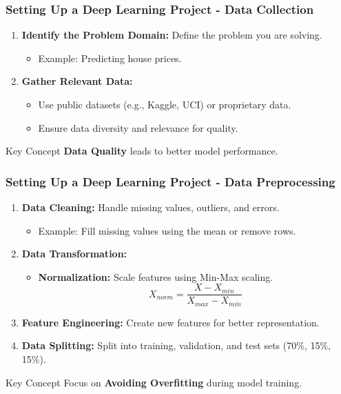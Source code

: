 \documentclass[aspectratio=169]{beamer}
\begin{document}
\begin{frame}[fragile]
    \frametitle{Setting Up a Deep Learning Project - Data Collection}
    \begin{enumerate}
        \item \textbf{Identify the Problem Domain:} Define the problem you are solving. 
            \begin{itemize}
                \item Example: Predicting house prices.
            \end{itemize}
        \item \textbf{Gather Relevant Data:}
            \begin{itemize}
                \item Use public datasets (e.g., Kaggle, UCI) or proprietary data.
                \item Ensure data diversity and relevance for quality.
            \end{itemize}
    \end{enumerate}
    \begin{block}{Key Concept}
        \textbf{Data Quality} leads to better model performance.
    \end{block}
\end{frame}

\begin{frame}[fragile]
    \frametitle{Setting Up a Deep Learning Project - Data Preprocessing}
    \begin{enumerate}
        \item \textbf{Data Cleaning:} Handle missing values, outliers, and errors.
            \begin{itemize}
                \item Example: Fill missing values using the mean or remove rows.
            \end{itemize}
        \item \textbf{Data Transformation:}
            \begin{itemize}
                \item \textbf{Normalization:} Scale features using Min-Max scaling.
                \begin{equation}
                X_{norm} = \frac{X - X_{min}}{X_{max} - X_{min}}
                \end{equation}
            \end{itemize}
        \item \textbf{Feature Engineering:} Create new features for better representation.
        \item \textbf{Data Splitting:} Split into training, validation, and test sets (70\%, 15\%, 15\%).
    \end{enumerate}
    \begin{block}{Key Concept}
        Focus on \textbf{Avoiding Overfitting} during model training.
    \end{block}
\end{frame}
\end{document}
